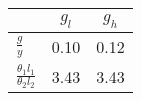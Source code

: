 \begin{tiny}\begin{tabular}{|l|c|c|}
\hline
&\textbf{$g_l$}&\textbf{$g_h$}\\\hline
\textbf{$\frac{g}{y}$}&0.10&0.12\\\hline
\textbf{$\frac{\theta_1 l_1}{\theta_2 l_2}$}&3.43&3.43\\\hline
\end{tabular}
\end{tiny}